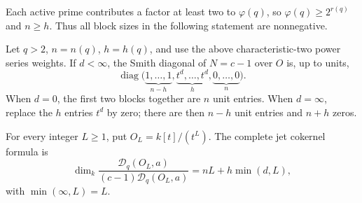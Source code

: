 Each active prime contributes a factor at least two to $\varphi(q)$,
so $\varphi(q)\ge2^{r(q)}$ and $n\ge h$. Thus all block sizes in
the following statement are nonnegative.

\begin{theorem}\label{ir:thm:smith-jets}
Let $q>2$, $n=n(q)$, $h=h(q)$, and use the above characteristic-two
power series weights. If $d<\infty$, the Smith diagonal of
$N=c-1$ over $O$ is, up to units,
\begin{equation}\label{ir:eq:smith-contact}
 \operatorname{diag}\bigl(
    \underbrace{1,\ldots,1}_{n-h},
    \underbrace{t^d,\ldots,t^d}_{h},
    \underbrace{0,\ldots,0}_{n}\bigr).
\end{equation}
When $d=0$, the first two blocks together are $n$ unit entries.
When $d=\infty$, replace the $h$ entries $t^d$ by zero; there are
then $n-h$ unit entries and $n+h$ zeros.

For every integer $L\ge1$, put $O_L=k[t]/(t^L)$. The complete jet
cokernel formula is
\begin{equation}\label{ir:eq:jet-length}
 \dim_k\frac{\mathcal D_q(O_L,a)}{(c-1)\mathcal D_q(O_L,a)}
 =nL+h\min(d,L),
\end{equation}
with $\min(\infty,L)=L$.
\end{theorem}

